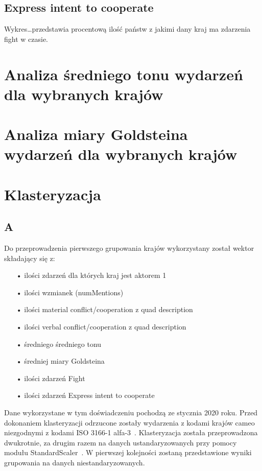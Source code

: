 \documentclass[11pt]{report}
\begin{document}
    \subsection{Express intent to cooperate}

    Wykres\ldots przedstawia procentową ilość państw z jakimi dany kraj ma zdarzenia fight w czasie.


    \section{Analiza średniego tonu wydarzeń dla wybranych krajów}


    \section{Analiza miary Goldsteina wydarzeń dla wybranych krajów}


    \section{Klasteryzacja}

    \subsection{A}

    Do przeprowadzenia pierwszego grupowania krajów wykorzystany został wektor składający się z:
    \begin{enumerate}
        \item[•] ilości zdarzeń dla których kraj jest aktorem 1
        \item[•] ilości wzmianek (numMentions)
        \item[•] ilości material conflict/cooperation z quad description
        \item[•] ilości verbal conflict/cooperation z quad description
        \item[•] średniego średniego tonu
        \item[•] średniej miary Goldsteina
        \item[•] ilości zdarzeń Fight
        \item[•] ilości zdarzeń Express intent to cooperate
    \end{enumerate}
    Dane wykorzystane w tym doświadczeniu pochodzą ze stycznia 2020 roku.
    Przed dokonaniem klasteryzacji odrzucone zostały wydarzenia z kodami krajów cameo niezgodnymi z kodami ISO 3166-1 alfa-3~\cite{iso_alfa3}.
    Klasteryzacja została przeprowadzona dwukrotnie, za drugim razem na danych ustandaryzowanych przy pomocy modułu StandardScaler~\cite{standardScaler}.
    W pierwszej kolejności zostaną przedstawione wyniki grupowania na danych niestandaryzowanych.
\end{document}
